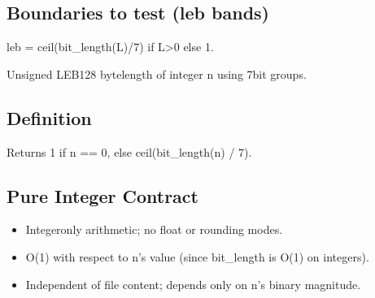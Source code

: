 \documentclass[letterpaper,10pt,english]{sphinxmanual}
\begin{document}
\subsection{Boundaries to test (leb bands)}
\label{\detokenize{clf_maximal_validator:boundaries-to-test-leb-bands}}\begin{description}
\sphinxAtStartPar
leb = ceil(bit\_length(L)/7) if L\textgreater{}0 else 1.

\end{description}

\begin{fulllineitems}
\label{\detokenize{clf_maximal_validator:CLF_MAXIMAL_VALIDATOR_FINAL.leb_len_u}}
\pysigstartsignatures
\pysiglinewithargsret
{}
{}
{}
\pysigstopsignatures
\sphinxAtStartPar
Unsigned LEB128 byte\sphinxhyphen{}length of integer n using 7\sphinxhyphen{}bit groups.


\subsection{Definition}
\label{\detokenize{clf_maximal_validator:definition}}
\sphinxAtStartPar
Returns 1 if n == 0, else ceil(bit\_length(n) / 7).


\subsection{Pure Integer Contract}
\label{\detokenize{clf_maximal_validator:pure-integer-contract}}\begin{itemize}
\item {} 
\sphinxAtStartPar
Integer\sphinxhyphen{}only arithmetic; no float or rounding modes.

\item {} 
\sphinxAtStartPar
O(1) with respect to n’s value (since bit\_length is O(1) on integers).

\item {} 
\sphinxAtStartPar
Independent of file content; depends only on n’s binary magnitude.

\end{itemize}
\begin{quote}\begin{description}
\sphinxAtStartPar
{}


\end{description}
\end{quote}
\end{fulllineitems}
\end{document}
